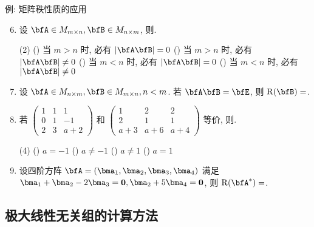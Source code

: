 \begin{frame}{例: 矩阵秩性质的应用}
	\begin{exercise}
		\begin{enumerate}
			\setcounter{enumi}{5}
			\item 设 $\bfA\in M_{m\times n},\bfB\in M_{n\times m}$, 则.
			\begin{exchoice}(2)
				() 当 $m>n$ 时, 必有 $|\bfA\bfB|=0$
				() 当 $m>n$ 时, 必有 $|\bfA\bfB|\neq0$
				() 当 $m<n$ 时, 必有 $|\bfA\bfB|=0$
				() 当 $m<n$ 时, 必有 $|\bfA\bfB|\neq0$
			\end{exchoice}
			\item 设 $\bfA\in M_{n\times m},\bfB\in M_{m\times n},n<m$. 若 $\bfA\bfB=\bfE$, 则 $\rank(\bfB)=$.
			\item 若 $\begin{pmatrix}
				1&1&1\\0&1&-1\\2&3&a+2
			\end{pmatrix}$ 和 $\begin{pmatrix}
				1&2&2\\2&1&1\\a+3&a+6&a+4
			\end{pmatrix}$ 等价, 则.
			\begin{exchoice}(4)
				() $a=-1$
				() $a\neq-1$
				() $a\neq 1$
				() $a=1$
			\end{exchoice}
			\item 设四阶方阵 $\bfA=(\bma_1,\bma_2,\bma_3,\bma_4)$ 满足 $\bma_1+\bma_2-2\bma_3={\bf0},\bma_2+5\bma_4={\bf0}$, 则 $\rank(\bfA^*)=$.
		\end{enumerate}
	\end{exercise}
\end{frame}


\subsection{极大线性无关组的计算方法}


